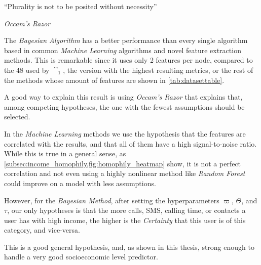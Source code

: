 \epigraph{``Plurality is not to be posited without necessity''}{\textit{Occam's Razor}}

The \emph{Bayesian Algorithm} has a better performance than every single algorithm based in common \emph{Machine Learning} algorithms and novel feature extraction methods.
This is remarkable since it uses only 2 features per node, compared to the 48 used by $\cat_1$, the version with the highest resulting metrics, or the rest of the methods whose amount of features are shown in \cref{tab:datasettable}.

A good way to explain this result is using \emph{Occam's Razor} that explains that, among competing hypotheses, the one with the fewest assumptions should be selected.

In the \emph{Machine Learning} methods we use the hypothesis that the features are correlated with the results, and that all of them have a high signal-to-noise ratio.
While this is true in a general sense, as \cref{subsec:income_homophily,fig:homophily_heatmap} show, it is not a perfect correlation and not even using a highly nonlinear method like \emph{Random Forest} could improve on a model with less assumptions.

However, for the \emph{Bayesian Method}, after setting the hyperparameters $\varpi$, $\Theta$, and $\tau$, our only hypotheses is that the more calls, SMS, calling time, or contacts a user has with high income, the higher is the \emph{Certainty} that this user is of this category, and vice-versa.

This is a good general hypothesis, and, as shown in this thesis, strong enough to handle a very good socioeconomic level predictor.
